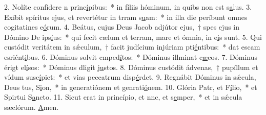 2. Nolíte confídere n princ\uline{í}pibus:~* in fíliis hóminum, in quibs non est s\uline{a}lus.
3. Exíbit spíritus ejus, et revertétur in trram s\uline{u}am:~* in illa die períbunt omnes cogitatines e\uline{ó}rum.
4. Beátus, cujus Deus Jacob adjútor ejus,~† spes ejus in Dómino De ips\uline{í}us:~* qui fecit cælum et terram, mare et ómnia,  in e\uline{i}s sunt.
5. Qui custódit veritátem in sǽculum,~† facit judícium injúriam pti\uline{é}ntibus:~* dat escam esriént\uline{i}bus.
6. Dóminus solvit cmped\uline{í}tos:~* Dóminus illminat c\uline{æ}cos.
7. Dóminus érigt el\uline{í}sos:~* Dóminus dligit j\uline{u}stos.
8. Dóminus custódit ádvenas,~† pupíllum et vídum susc\uline{í}piet:~* et vias peccatrum disp\uline{é}rdet.
9. Regnábit Dóminus in sǽcula, Deus tus, S\uline{i}on,~* in generatiónem et genrati\uline{ó}nem.
10. Glória Patr, et F\uline{í}lio,~* et Spirtui S\uline{a}ncto.
11. Sicut erat in princípio, et nnc, et s\uline{e}mper,~* et in sǽcula sæclórum. \uline{A}men.
